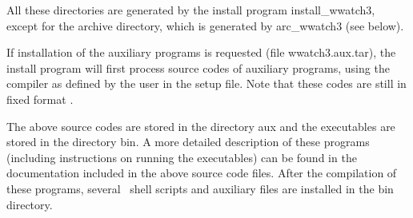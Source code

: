 \noindent
All these directories are generated by the install program {\file
install\_wwatch3}, except for the archive directory, which is generated by
{\file arc\_wwatch3} (see below).

If installation of the auxiliary programs is requested (file {\file
wwatch3.aux.tar}), the install program will first process source codes of
auxiliary programs, using the compiler as defined by the user in the setup
file. Note that these codes are still in fixed format .

\begin{flist}
\end{flist}

\noindent
The above source codes are stored in the directory {\dir aux} and the
executables are stored in the directory {\dir bin}. A more detailed
description of these programs (including instructions on running the
executables) can be found in the documentation included in the above source
code files. After the compilation of these programs, several \unix\ shell
scripts and auxiliary files are installed in the {\dir bin} directory.

